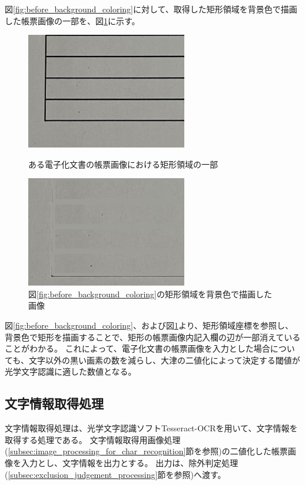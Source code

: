 図\ref{fig:before_background_coloring}に対して、取得した矩形領域を背景色で描画した帳票画像の一部を、図\ref{fig:after_background_coloring}に示す。
\begin{figure}[tp]
    \centering
    \begin{minipage}[c]{0.45\linewidth}
        \centering
        \includegraphics[keepaspectratio, width=7cm]{image/04-implementation/before_background_coloring.jpg}
        \caption{ある電子化文書の帳票画像における矩形領域の一部}
        \label{fig:before_background_coloring}
    \end{minipage}
    \begin{minipage}[c]{0.45\linewidth}
        \centering
        \includegraphics[keepaspectratio, width=7cm]{image/04-implementation/after_background_coloring.png}
        \caption{図\ref{fig:before_background_coloring}の矩形領域を背景色で描画した画像}
        \label{fig:after_background_coloring}
    \end{minipage}
\end{figure}
図\ref{fig:before_background_coloring}、および図\ref{fig:after_background_coloring}より、矩形領域座標を参照し、背景色で矩形を描画することで、矩形の帳票画像内記入欄の辺が一部消えていることがわかる。
これによって、電子化文書の帳票画像を入力とした場合についても、文字以外の黒い画素の数を減らし、大津の二値化によって決定する閾値が光学文字認識に適した数値となる。

\subsection{文字情報取得処理}\label{subsec:char_information_obtainment_processing}
文字情報取得処理は、光学文字認識ソフトTesseract-OCRを用いて、文字情報を取得する処理である。
文字情報取得用画像処理(\ref{subsec:image_processing_for_char_recognition}節を参照)の二値化した帳票画像を入力とし、文字情報を出力とする。
出力は、除外判定処理(\ref{subsec:exclusion_judgement_processing}節を参照)へ渡す。

